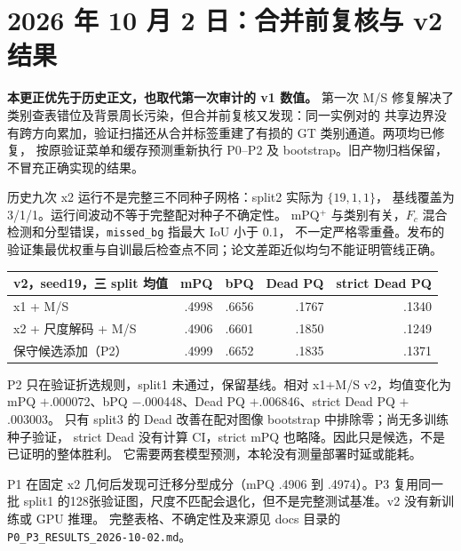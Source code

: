 \section*{2026 年 10 月 2 日：合并前复核与 v2 结果}
\textbf{本更正优先于历史正文，也取代第一次审计的 v1 数值。}
第一次 M/S 修复解决了类别查表错位及背景周长污染，但合并前复核又发现：同一实例对的
共享边界没有跨方向累加，验证扫描还从合并标签重建了有损的 GT 类别通道。两项均已修复，
按原验证菜单和缓存预测重新执行 P0--P2 及 bootstrap。旧产物归档保留，不冒充正确实现的结果。

历史九次 x2 运行不是完整三不同种子网格：split2 实际为 $\{19,1,1\}$，
基线覆盖为 3/1/1。运行间波动不等于完整配对种子不确定性。
mPQ$^+$ 与类别有关，$F_c$ 混合检测和分型错误，\texttt{missed\_bg} 指最大 IoU 小于 0.1，
不一定严格零重叠。发布的验证集最优权重与自训最后检查点不同；论文差距近似均匀不能证明管线正确。

\begin{center}\small
\begin{tabular}{lrrrr}
\toprule
v2，seed19，三 split 均值 & mPQ & bPQ & Dead PQ & strict Dead PQ\\
\midrule
x1 + M/S & .4998 & .6656 & .1767 & .1340\\
x2 + 尺度解码 + M/S & .4906 & .6601 & .1850 & .1249\\
保守候选添加（P2） & .4999 & .6652 & .1835 & .1371\\
\bottomrule
\end{tabular}
\end{center}

P2 只在验证折选规则，split1 未通过，保留基线。相对 x1+M/S v2，均值变化为
mPQ $+$.000072、bPQ $-$.000448、Dead PQ $+$.006846、strict Dead PQ $+$.003003。
只有 split3 的 Dead 改善在配对图像 bootstrap 中排除零；尚无多训练种子验证，
strict Dead 没有计算 CI，strict mPQ 也略降。因此只是候选，不是已证明的整体胜利。
它需要两套模型预测，本轮没有测量部署时延或能耗。

P1 在固定 x2 几何后发现可迁移分型成分（mPQ .4906 到 .4974）。P3 复用同一批 split1
的128张验证图，尺度不匹配会退化，但不是完整测试基准。v2 没有新训练或 GPU 推理。
完整表格、不确定性及来源见 docs 目录的 \texttt{P0\_P3\_RESULTS\_2026-10-02.md}。
\clearpage

